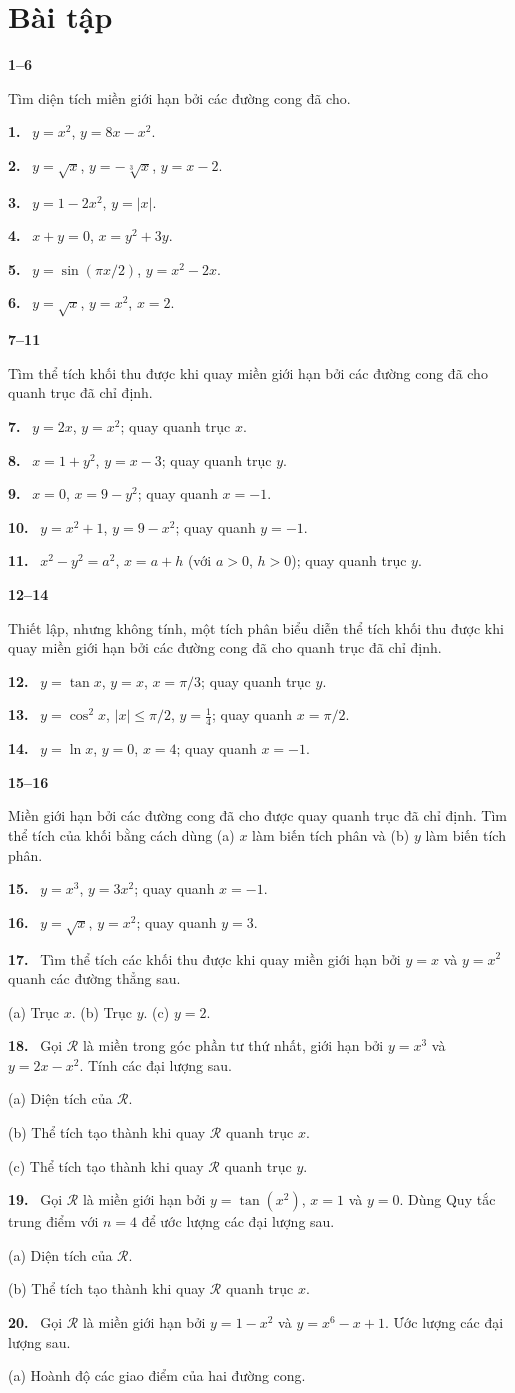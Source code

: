\documentclass[12pt,a4paper]{article}
\newcommand{\bt}[1]{\par\smallskip\Needspace{5\baselineskip}\noindent\textbf{#1.}\ }
\newcommand{\group}[1]{\par\Needspace{11\baselineskip}\medskip\noindent\textbf{#1}\par\nopagebreak[4]}
\begin{document}
\clearpage
\section*{Bài tập}
\group{1–6}
Tìm diện tích miền giới hạn bởi các đường cong đã cho.
\bt{1} $y=x^2$, $y=8x-x^2$.
\bt{2} $y=\sqrt{x}$, $y=-\sqrt[3]{x}$, $y=x-2$.
\bt{3} $y=1-2x^2$, $y=|x|$.
\bt{4} $x+y=0$, $x=y^2+3y$.
\bt{5} $y=\sin(\pi x/2)$, $y=x^2-2x$.
\bt{6} $y=\sqrt{x}$, $y=x^2$, $x=2$.
\group{7–11}
Tìm thể tích khối thu được khi quay miền giới hạn bởi các đường cong đã cho quanh trục đã chỉ định.
\bt{7} $y=2x$, $y=x^2$; quay quanh trục $x$.
\bt{8} $x=1+y^2$, $y=x-3$; quay quanh trục $y$.
\bt{9} $x=0$, $x=9-y^2$; quay quanh $x=-1$.
\bt{10} $y=x^2+1$, $y=9-x^2$; quay quanh $y=-1$.
\bt{11} $x^2-y^2=a^2$, $x=a+h$ (với $a>0$, $h>0$); quay quanh trục $y$.
\group{12–14}
Thiết lập, nhưng không tính, một tích phân biểu diễn thể tích khối thu được khi quay miền giới hạn bởi các đường cong đã cho quanh trục đã chỉ định.
\bt{12} $y=\tan x$, $y=x$, $x=\pi/3$; quay quanh trục $y$.
\bt{13} $y=\cos^2x$, $|x|\le\pi/2$, $y=\frac14$; quay quanh $x=\pi/2$.
\bt{14} $y=\ln x$, $y=0$, $x=4$; quay quanh $x=-1$.
\group{15–16}
Miền giới hạn bởi các đường cong đã cho được quay quanh trục đã chỉ định. Tìm thể tích của khối bằng cách dùng (a) $x$ làm biến tích phân và (b) $y$ làm biến tích phân.
\bt{15} $y=x^3$, $y=3x^2$; quay quanh $x=-1$.
\bt{16} $y=\sqrt{x}$, $y=x^2$; quay quanh $y=3$.
\bt{17} Tìm thể tích các khối thu được khi quay miền giới hạn bởi $y=x$ và $y=x^2$ quanh các đường thẳng sau.

(a) Trục $x$. \qquad (b) Trục $y$. \qquad (c) $y=2$.
\bt{18} Gọi $\mathcal R$ là miền trong góc phần tư thứ nhất, giới hạn bởi $y=x^3$ và $y=2x-x^2$. Tính các đại lượng sau.

(a) Diện tích của $\mathcal R$.

(b) Thể tích tạo thành khi quay $\mathcal R$ quanh trục $x$.

(c) Thể tích tạo thành khi quay $\mathcal R$ quanh trục $y$.
\bt{19} Gọi $\mathcal R$ là miền giới hạn bởi $y=\tan(x^2)$, $x=1$ và $y=0$. Dùng Quy tắc trung điểm với $n=4$ để ước lượng các đại lượng sau.

(a) Diện tích của $\mathcal R$.

(b) Thể tích tạo thành khi quay $\mathcal R$ quanh trục $x$.
\bt{20} Gọi $\mathcal R$ là miền giới hạn bởi $y=1-x^2$ và $y=x^6-x+1$. Ước lượng các đại lượng sau.

(a) Hoành độ các giao điểm của hai đường cong.
\end{document}
